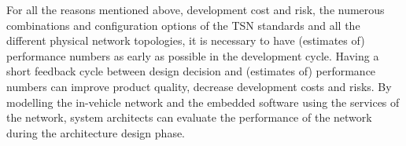 For all the reasons mentioned above, development cost and risk, the numerous combinations and configuration options of the TSN standards and all the different physical network topologies, it is necessary to have (estimates of) performance numbers as early as possible in the development cycle. Having a short feedback cycle between design decision and (estimates of) performance numbers can improve product quality, decrease development costs and risks. By modelling the in-vehicle network and the embedded software using the services of the network, system architects can evaluate the performance of the network during the architecture design phase.